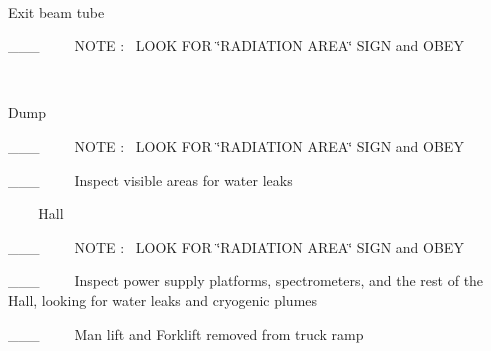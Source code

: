 ~

Exit beam tube

\_\_\_~~~~~NOTE :~ LOOK FOR \char`\"{}RADIATION AREA\char`\"{} SIGN and OBEY

~

Dump

\_\_\_~~~~~NOTE :~ LOOK FOR \char`\"{}RADIATION AREA\char`\"{} SIGN and OBEY

\_\_\_~~~~~Inspect visible areas for water leaks

~
~
~Hall 

\_\_\_~~~~~NOTE :~ LOOK FOR \char`\"{}RADIATION AREA\char`\"{} SIGN and OBEY

\_\_\_~~~~~Inspect power supply platforms, spectrometers, and the rest of the
Hall, looking for water leaks and cryogenic plumes

\_\_\_~~~~~Man lift and Forklift removed from truck ramp
%
